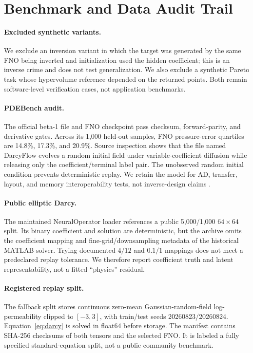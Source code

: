 \section{Benchmark and Data Audit Trail}
\label{app:data-audit}

\paragraph{Excluded synthetic variants.}
We exclude an inversion variant in which the target was generated by the same
FNO being inverted and initialization used the hidden coefficient; this is an
inverse crime and does not test generalization.  We also exclude a synthetic
Pareto task whose hypervolume reference depended on the returned points.  Both
remain software-level verification cases, not application benchmarks.

\paragraph{PDEBench audit.}
The official beta-1 file and FNO checkpoint pass checksum, forward-parity, and
derivative gates.  Across its 1,000 held-out samples, FNO pressure-error
quartiles are 14.8\%, 17.3\%, and 20.9\%.  Source inspection shows that the
file named DarcyFlow evolves a random initial field under variable-coefficient
diffusion while releasing only the coefficient/terminal label pair.  The
unobserved random initial condition prevents deterministic replay.  We retain
the model for AD, transfer, layout, and memory interoperability tests, not inverse-design
claims \citep{takamoto2022pdebench}.

\paragraph{Public elliptic Darcy.}
The maintained NeuralOperator loader references a public 5,000/1,000
$64\times64$ split.  Its binary coefficient and solution are deterministic,
but the archive omits the coefficient mapping and fine-grid/downsampling
metadata of the historical MATLAB solver.  Trying documented $4/12$ and
$0.1/1$ mappings does not meet a predeclared replay tolerance.  We therefore
report coefficient truth and latent representability, not a fitted ``physics''
residual.

\paragraph{Registered replay split.}
The fallback split stores continuous zero-mean Gaussian-random-field
log-permeability clipped to $[-3,3]$, with train/test seeds 20260823/20260824.
Equation~\ref{eq:darcy} is solved in float64 before storage.  The manifest
contains SHA-256 checksums of both tensors and the selected FNO.  It is labeled
a fully specified standard-equation split, not a public community benchmark.

